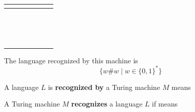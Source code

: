 \documentclass[12pt, oneside]{article}
\begin{document}
\begin{multicols}{2}
\begin{tabular}{|c|c|c|c|c|c|c|}
  \hline
  \multicolumn{7}{|c|}{\phantom{A}}\\
  \hline
  \phantom{AA} & \phantom{AA}& \phantom{AA}& \phantom{AA}& \phantom{AA}& \phantom{AA}& \phantom{AA} \\
  \hline
  \multicolumn{7}{|c|}{\phantom{A}}\\
  \hline
  \phantom{AA} & \phantom{AA}& \phantom{AA}& \phantom{AA}& \phantom{AA}& \phantom{AA}& \phantom{AA} \\
  \hline
  \multicolumn{7}{|c|}{\phantom{A}}\\
  \hline
  \phantom{AA} & \phantom{AA}& \phantom{AA}& \phantom{AA}& \phantom{AA}& \phantom{AA}& \phantom{AA} \\
  \hline
  \multicolumn{7}{|c|}{\phantom{A}}\\
  \hline
  \phantom{AA} & \phantom{AA}& \phantom{AA}& \phantom{AA}& \phantom{AA}& \phantom{AA}& \phantom{AA} \\
  \hline
  \multicolumn{7}{|c|}{\phantom{A}}\\
  \hline
  \phantom{AA} & \phantom{AA}& \phantom{AA}& \phantom{AA}& \phantom{AA}& \phantom{AA}& \phantom{AA} \\
  \hline
  \multicolumn{7}{|c|}{\phantom{A}}\\
  \hline
  \phantom{AA} & \phantom{AA}& \phantom{AA}& \phantom{AA}& \phantom{AA}& \phantom{AA}& \phantom{AA} \\
  \hline
  \multicolumn{7}{|c|}{\phantom{A}}\\
  \hline
  \phantom{AA} & \phantom{AA}& \phantom{AA}& \phantom{AA}& \phantom{AA}& \phantom{AA}& \phantom{AA} \\
  \hline
  \multicolumn{7}{|c|}{\phantom{A}}\\
  \hline
  \phantom{AA} & \phantom{AA}& \phantom{AA}& \phantom{AA}& \phantom{AA}& \phantom{AA}& \phantom{AA} \\
  \hline
  \end{tabular}
\end{multicols}

The language recognized by this machine is
\[
  \{ w \# w \mid w \in \{0,1\}^* \}
\]

\newpage

  A language $L$ is {\bf recognized by} a Turing machine $M$ means

  \vspace{20pt}

  A Turing  machine  $M$ {\bf  recognizes} a language $L$ if means

  \vspace{20pt}
  
\end{document}
